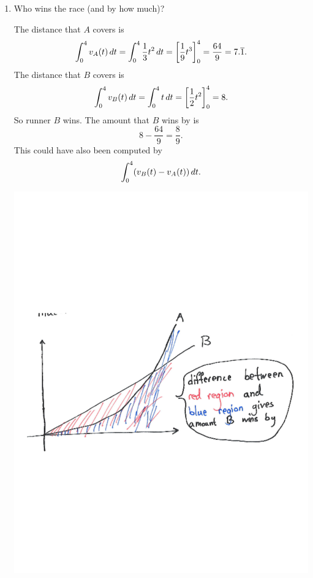 \documentclass[noinstructornotes]{ximera}
\begin{document}
\begin{problem}
\begin{enumerate}
		\item  Who wins the race (and by how much)?
		\begin{freeResponse}
		The distance that $A$ covers is
		\[
		\int_0^4 v_A(t) \,d t = \int_0^4 \frac{1}{3} t^2 \,d t = \bigg[ \frac{1}{9} t^3 \bigg]_0^4 = \frac{64}{9} = 7.\overline{1}.
		\]
		The distance that $B$ covers is
		\[
		\int_0^4 v_B(t) \,d t = \int_0^4 t \,d t = \bigg[ \frac{1}{2} t^2 \bigg]_0^4 = 8.
		\]
		So runner $B$ wins.  The amount that $B$ wins by is
		\[
		8 - \frac{64}{9} = \frac{8}{9}.
		\]
		This could have also been computed by
		\[
		\int_0^4 (v_B(t) - v_A(t)) \,d t.
		\]
			\begin{image}
			\includegraphics[trim= 130 250 100 250,scale=0.6]{Figure6-2-7.pdf}
			\end{image}
		\end{freeResponse}
		
		\end{enumerate}

\end{problem}
\end{document}
